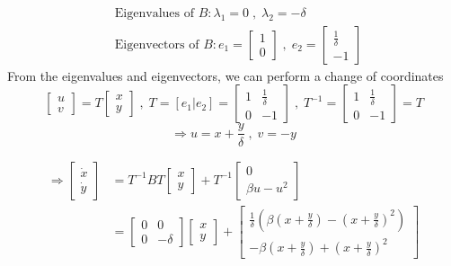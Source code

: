 \documentclass[twoside,10pt,a4paper]{article}
\begin{document}
\begin{enumerate}[label=(\alph*)]
\begin{align*}
	& \text{Eigenvalues of } B: \lambda_1 = 0 \; , \; \lambda_2 = -\delta \\
	& \text{Eigenvectors of } B: e_1 = \begin{bmatrix}
		1 \\ 0
	\end{bmatrix} \; , \; e_2 = \begin{bmatrix}
		\frac{1}{\delta} \\ -1
	\end{bmatrix}
\end{align*}
From the eigenvalues and eigenvectors, we can perform a change of coordinates
\begin{equation*}
	\begin{bmatrix}
		u \\ v
	\end{bmatrix} = T \begin{bmatrix}
		x \\ y
	\end{bmatrix} \; , \; T = [e_1 \vert e_2] = \begin{bmatrix}
		1 & \frac{1}{\delta} \\ 0 & -1
	\end{bmatrix} \; , \; T^{-1} = \begin{bmatrix}
		1 & \frac{1}{\delta} \\ 0 & -1
	\end{bmatrix} = T
\end{equation*}
\begin{equation*}
	\Longrightarrow u = x + \frac{y}{\delta} \; , \; v = -y
\end{equation*}

\begin{align}
	\Longrightarrow \begin{bmatrix}
		\dot{x} \\ \dot{y}
	\end{bmatrix} &= T^{-1}BT \begin{bmatrix}
		x \\ y
	\end{bmatrix} + T^{-1} \begin{bmatrix}
		0 \\ \beta u - u^2
	\end{bmatrix} \nonumber \\
	\label{S04E021}
	&= \begin{bmatrix}
		0  & 0 \\ 0 & -\delta
	\end{bmatrix} \begin{bmatrix}
		x \\ y
	\end{bmatrix} + \begin{bmatrix}
		\frac{1}{\delta} \left( \beta \left( x + \frac{y}{\delta} \right) - \left( x + \frac{y}{\delta} \right)^2 \right) \\
		-\beta \left( x + \frac{y}{\delta} \right) + \left( x + \frac{y}{\delta} \right)^2
	\end{bmatrix} 
\end{align}


\end{enumerate}
\end{document}
